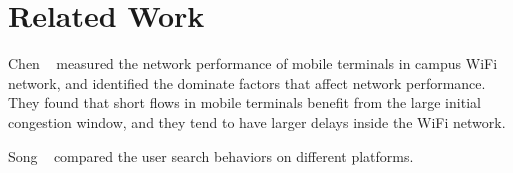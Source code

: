 
\section{Related Work}
\label{sec:related}

Chen \etal~\cite{chen2012network} measured the network performance of mobile terminals in campus WiFi network, and identified the dominate factors that affect network performance. They found that short flows in mobile terminals benefit from the large initial congestion window, and they tend to have larger delays inside the WiFi network.

Song \etal~\cite{Song:2013:EEU:2488388.2488493} compared the user search behaviors on different platforms. 